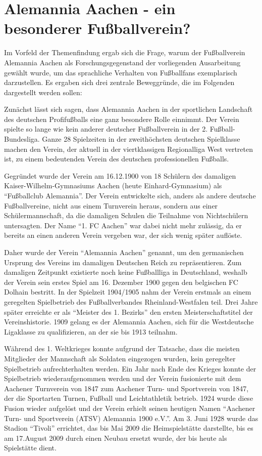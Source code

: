 \section{Alemannia Aachen - ein besonderer Fußballverein?}
Im Vorfeld der Themenfindung ergab sich die Frage, warum der Fußballverein Alemannia Aachen als Forschungsgegenstand der vorliegenden Ausarbeitung gewählt wurde, um das sprachliche
Verhalten von Fußballfans exemplarisch darzustellen.
Es ergaben sich drei zentrale Beweggründe, die im Folgenden dargestellt werden sollen:

Zunächst lässt sich sagen, dass Alemannia Aachen in der sportlichen Landschaft des deutschen Profifußballs eine ganz besondere Rolle einnimmt.
Der Verein spielte so lange wie kein anderer deutscher Fußballverein in der 2. Fußball-Bundesliga.
Ganze 28 Spielzeiten in der zweithöchsten deutschen Spielklasse machen den Verein, der aktuell in der viertklassigen Regionalliga West vertreten ist, zu einem bedeutenden Verein des deutschen professionellen Fußballs.

Gegründet wurde der Verein am 16.12.1900 von 18 Schülern des damaligen Kaiser-Wilhelm-Gymnasiums Aachen (heute Einhard-Gymnasium) als "`Fußballclub Alemannia"'\cite{AA14}.
Der Verein entwickelte sich, anders als andere deutsche Fußballvereine, nicht aus einem Turnverein heraus, sondern aus einer Schülermannschaft, da die damaligen Schulen die Teilnahme von Nichtschülern untersagten.
Der Name "`1. FC Aachen"' war dabei nicht mehr zulässig, da er bereits an einen anderen Verein vergeben war, der sich wenig später auflöste.

Daher wurde der Verein "`Alemannia Aachen"' genannt, um den germanischen Ursprung des Vereins im damaligen Deutschen Reich zu repräsentieren.
Zum damaligen Zeitpunkt existierte noch keine Fußballliga in Deutschland, weshalb der Verein sein erstes Spiel am 16. Dezember 1900 gegen den belgischen FC Dolhain bestritt.
In der Spielzeit 1904/1905 nahm der Verein erstmals an einem geregelten Spielbetrieb des Fußballverbandes Rheinland-Westfalen teil.
Drei Jahre später erreichte er als "`Meister des 1. Bezirks"' den ersten Meisterschaftstitel der Vereinshistorie.
1909 gelang es der Alemannia Aachen, sich für die Westdeutsche Ligaklasse zu qualifizieren, an der sie bis 1913 teilnahm.

Während des 1. Weltkrieges konnte aufgrund der Tatsache, dass die meisten Mitglieder der Mannschaft als Soldaten eingezogen wurden, kein geregelter Spielbetrieb aufrechterhalten werden.
Ein Jahr nach Ende des Krieges konnte der Spielbetrieb wiederaufgenommen werden und der Verein fusionierte mit dem Aachener Turnverein von 1847 zum Aachener Turn- und Sportverein von 1847, der die Sportarten Turnen, Fußball und Leichtathletik betrieb.
1924 wurde diese Fusion wieder aufgelöst und der Verein erhielt seinen heutigen Namen "`Aachener Turn- und Sportverein (ATSV) Alemannia 1900 e.V."'.
Am 3. Juni 1928 wurde das Stadion "`Tivoli"' errichtet, das bis Mai 2009 die Heimspielstätte darstellte, bis es am 17.August 2009 durch einen Neubau ersetzt wurde, der bis heute als Spielstätte dient.

